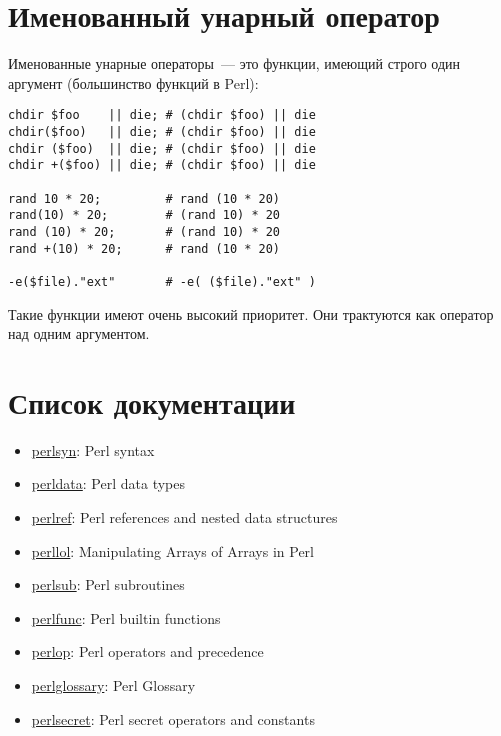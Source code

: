 \section{Именованный унарный оператор}
{Именованные унарные операторы}~--- это функции, имеющий строго один аргумент (большинство функций в Perl):
\begin{verbatim}
chdir $foo    || die; # (chdir $foo) || die
chdir($foo)   || die; # (chdir $foo) || die
chdir ($foo)  || die; # (chdir $foo) || die
chdir +($foo) || die; # (chdir $foo) || die

rand 10 * 20;         # rand (10 * 20) 
rand(10) * 20;        # (rand 10) * 20
rand (10) * 20;       # (rand 10) * 20
rand +(10) * 20;      # rand (10 * 20) 

-e($file)."ext"       # -e( ($file)."ext" )
\end{verbatim}
Такие функции имеют очень высокий приоритет. Они трактуются как оператор над одним аргументом.

\section{Список документации}
\begin{itemize}
	\item \href{http://perldoc.perl.org/perlsyn.html}{perlsyn}: Perl syntax
	\item \href{http://perldoc.perl.org/perldata.html}{perldata}: Perl data types
	\item \href{http://perldoc.perl.org/perlref.html}{perlref}: Perl references and nested data structures
	\item \href{http://perldoc.perl.org/perllol.html}{perllol}: Manipulating Arrays of Arrays in Perl
	\item \href{http://perldoc.perl.org/perlsub.html}{perlsub}: Perl subroutines
	\item \href{http://perldoc.perl.org/perlfunc.html}{perlfunc}: Perl builtin functions
	\item \href{http://perldoc.perl.org/perlop.html}{perlop}: Perl operators and precedence
	\item \href{http://perldoc.perl.org/perlglossary.html}{perlglossary}: Perl Glossary
	\item \href{https://metacpan.org/pod/perlsecret}{perlsecret}: Perl secret operators and constants
\end{itemize}
